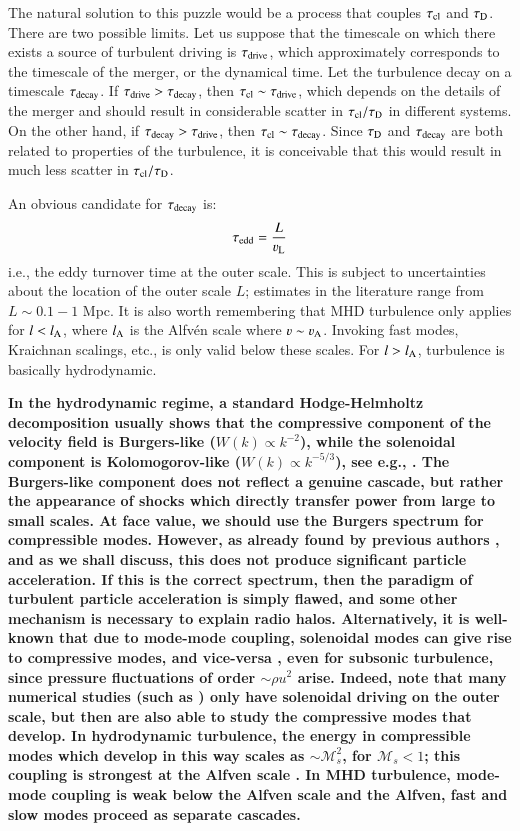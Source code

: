 \documentclass[fleqn,usenatbib,useAMS]{mnras}
\newcommand\C[1]{{\bf #1}}
\begin{document}
The natural solution to this puzzle would be a process that couples
$\tau_{\rm cl}$ and $\tau_{\rm D}$. There are two possible limits. Let
us suppose that the timescale on which there exists a source of
turbulent driving is $\tau_{\rm drive}$, which approximately
corresponds to the timescale of the merger, or the dynamical time. Let
the turbulence decay on a timescale $\tau_{\rm decay}$. If $\tau_{\rm
  drive} > \tau_{\rm decay}$, then $\tau_{\rm cl} \sim \tau_{\rm
  drive}$, which depends on the details of the merger and should
result in considerable scatter in $\tau_{\rm cl}/\tau_{\rm D}$ in
different systems. On the other hand, if $\tau_{\rm decay} > \tau_{\rm
  drive}$, then $\tau_{\rm cl} \sim \tau_{\rm decay}$. Since
$\tau_{\rm D}$ and $\tau_{\rm decay}$ are both related to properties
of the turbulence, it is conceivable that this would result in much
less scatter in $\tau_{\rm cl}/\tau_{\rm D}$.

An obvious candidate for $\tau_{\rm decay}$ is: 
\C{\begin{equation}
\tau_{\rm edd} = \frac{L}{\varv_{\rm L}}
\end{equation}}
i.e., the eddy turnover time at the outer scale. This is subject to
uncertainties about the location of the outer scale $L$; estimates in the
literature range from $L \sim 0.1-1$ Mpc. It is also worth remembering that MHD
turbulence only applies for $l < l_{\rm A}$, where $l_{\rm A}$ is the Alfv{\'e}n
scale where $\varv \sim \varv_{\rm A}$. Invoking fast modes, Kraichnan scalings,
etc., is only valid below these scales. For $l > l_{\rm A}$, turbulence is
basically hydrodynamic.  

\C{In the hydrodynamic regime, a standard Hodge-Helmholtz decomposition usually shows that the compressive component of the velocity field is Burgers-like ($W(k) \propto k^{-2}$), while the solenoidal component is Kolomogorov-like ($W(k) \propto k^{-5/3}$), see e.g., \citet{federrath13}. The Burgers-like component does not reflect a genuine cascade, but rather the appearance of shocks which directly transfer power from large to small scales. At face value, we should use the Burgers spectrum for compressible modes. However, as already found by previous authors \citep{miniati15, brunetti16}, and as we shall discuss, this does not produce significant particle acceleration. If this is the correct spectrum, then the paradigm of turbulent particle acceleration is simply flawed, and some other mechanism is necessary to explain radio halos. Alternatively, it is well-known that due to mode-mode coupling,  solenoidal modes can give rise to compressive modes, and vice-versa \citep{kida90,cho03,kritsuk07}, even for subsonic turbulence, since pressure fluctuations of order $\sim \rho u^{2}$ arise. Indeed, note that many numerical studies (such as \citet{cho03,kritsuk07}) only have solenoidal driving on the outer scale, but then are also able to study the compressive modes that develop. In hydrodynamic turbulence, the energy in compressible modes which develop in this way scales as $\sim \mathcal{M}_{s}^2$, for $\mathcal{M}_{s} < 1$; this coupling is strongest at the Alfven scale \citep{cho03}. In MHD turbulence, mode-mode coupling is weak below the Alfven scale and the Alfven, fast and slow modes proceed as separate cascades.}
\end{document}

